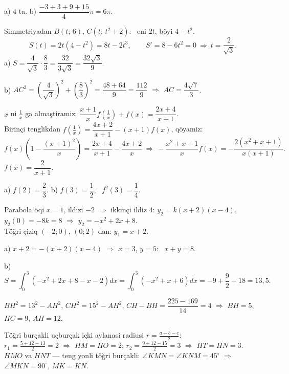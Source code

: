 a) $4$ ta. \quad b) $\dfrac{-3+3+9+15}4\pi=6\pi$.

\newpage
{}
Simmetriyadan $B(t;\,6)$, $C\left(t;\,t^2+2\right)$: \ eni $2t$, böyi $4-t^2$.
\[S(t)=2t\left(4-t^2\right)=8t-2t^3,\qquad S'=8-6t^2=0\ \Rightarrow\ t=\frac2{\sqrt3}.\]
a) $S=\dfrac4{\sqrt3}\cdot\dfrac83=\dfrac{32}{3\sqrt3}=\dfrac{32\sqrt3}9$.

b) $AC^2=\left(\dfrac4{\sqrt3}\right)^2+\left(\dfrac83\right)^2=\dfrac{48+64}9=\dfrac{112}9$ $\Rightarrow$ $AC=\dfrac{4\sqrt7}3$.

\newpage
{}
$x$ ni $\frac1x$ ga almaştiramiz: $\dfrac{x+1}x f\left(\frac1x\right)+f(x)=\dfrac{2x+4}{x+1}$.\\
Birinçi tenglikdan $f\left(\frac1x\right)=\dfrac{4x+2}{x+1}-(x+1)f(x)$, qöyamiz:
\[f(x)\left(1-\frac{(x+1)^2}x\right)=\frac{2x+4}{x+1}-\frac{4x+2}x\ \Rightarrow\ -\frac{x^2+x+1}x f(x)=-\frac{2\left(x^2+x+1\right)}{x(x+1)}.\]
$f(x)=\dfrac2{x+1}$.

a) $f(2)=\dfrac23$. \quad b) $f(3)=\dfrac12$, \ $f^2(3)=\dfrac14$.

\newpage
{}
Parabola öqi $x=1$, ildizi $-2$ $\Rightarrow$ ikkinçi ildiz $4$: $y_2=k(x+2)(x-4)$, $y_2(0)=-8k=8$ $\Rightarrow$ $y_2=-x^2+2x+8$.\\
Töğri çiziq $(-2;0)$, $(0;2)$ dan: $y_1=x+2$.

a) $x+2=-(x+2)(x-4)$ $\Rightarrow$ $x=3$, $y=5$: \ $x+y=8$.

b) \[S=\int_0^3\left(-x^2+2x+8-x-2\right)dx=\int_0^3\left(-x^2+x+6\right)dx=-9+\frac92+18=13{,}5.\]

\newpage
{}
$BH^2=13^2-AH^2$, $CH^2=15^2-AH^2$, $CH-BH=\dfrac{225-169}{14}=4$ $\Rightarrow$ $BH=5$, $HC=9$, $AH=12$.

Töğri burçakli uçburçak içki aylanasi radiusi $r=\frac{a+b-c}2$:\\
$r_1=\frac{5+12-13}2=2$ $\Rightarrow$ $HM=HO=2$; \quad $r_2=\frac{9+12-15}2=3$ $\Rightarrow$ $HT=HN=3$.
$HMO$ va $HNT$ — teng yonli töğri burçakli: $\angle KMN=\angle KNM=45^\circ$ $\Rightarrow$ $\angle MKN=90^\circ$, $MK=KN$.

